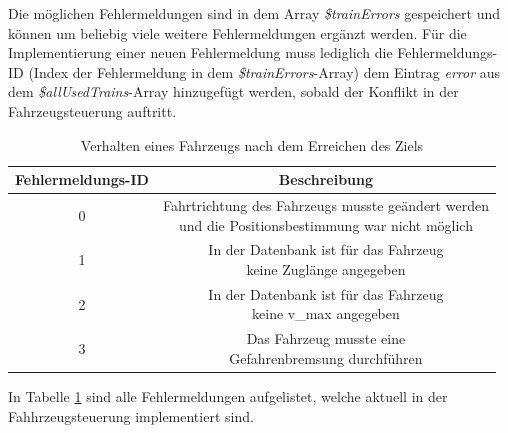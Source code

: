 Die möglichen Fehlermeldungen sind in dem Array \textit{\$trainErrors} gespeichert und können um beliebig viele weitere Fehlermeldungen ergänzt werden. Für die Implementierung einer neuen Fehlermeldung muss lediglich die Fehlermeldungs-ID (Index der Fehlermeldung in dem \textit{\$trainErrors}-Array) dem Eintrag \textit{error} aus dem \textit{\$allUsedTrains}-Array hinzugefügt werden, sobald der Konflikt in der Fahrzeugsteuerung auftritt.
\begin{table}
\begin{center}
\renewcommand{\arraystretch}{1.2}
\begin{tabular}{c|c}
Fehlermeldungs-ID & Beschreibung  \\ \hline
0 &    \makecell{Fahrtrichtung des Fahrzeugs musste geändert werden\\und die Positionsbestimmung war nicht möglich} \\\hline
1              &    \makecell{In der Datenbank ist für das Fahrzeug\\keine Zuglänge angegeben}             \\ \hline
2         &    \makecell{In der Datenbank ist für das Fahrzeug\\keine v\_max angegeben}             \\ \hline
3        &   \makecell{Das Fahrzeug musste eine\\Gefahrenbremsung durchführen}          \\ 
\end{tabular}
\renewcommand{\arraystretch}{1}
\caption{Verhalten eines Fahrzeugs nach dem Erreichen des Ziels}
\label{table:fehlertabelle}
\end{center}
\end{table}
In Tabelle \ref{table:fehlertabelle} sind alle Fehlermeldungen aufgelistet, welche aktuell in der Fahhrzeugsteuerung implementiert sind.







































